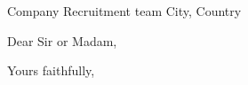 \documentclass[12pt,a4paper,sans]{moderncv}
\begin{document}
\recipient
{Company Recruitment team}
{City, Country}

\date{\today}
\opening{Dear Sir or Madam,}
\closing{Yours faithfully,}

\makelettertitle

\lipsum[1-3]

\makeletterclosing
\end{document}
